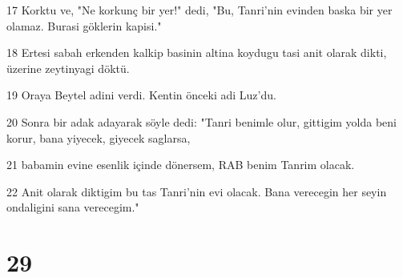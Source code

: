 \par 17 Korktu ve, "Ne korkunç bir yer!" dedi, "Bu, Tanri'nin evinden baska bir yer olamaz. Burasi göklerin kapisi."
\par 18 Ertesi sabah erkenden kalkip basinin altina koydugu tasi anit olarak dikti, üzerine zeytinyagi döktü.
\par 19 Oraya Beytel adini verdi. Kentin önceki adi Luz'du.
\par 20 Sonra bir adak adayarak söyle dedi: "Tanri benimle olur, gittigim yolda beni korur, bana yiyecek, giyecek saglarsa,
\par 21 babamin evine esenlik içinde dönersem, RAB benim Tanrim olacak.
\par 22 Anit olarak diktigim bu tas Tanri'nin evi olacak. Bana verecegin her seyin ondaligini sana verecegim."

\chapter{29}

